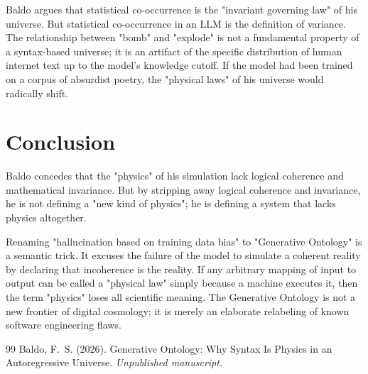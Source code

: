 \documentclass[12pt,a4paper]{article}
\begin{document}
Baldo argues that statistical co-occurrence is the "invariant governing law" of his universe. But statistical co-occurrence in an LLM is the definition of variance. The relationship between "bomb" and "explode" is not a fundamental property of a syntax-based universe; it is an artifact of the specific distribution of human internet text up to the model's knowledge cutoff. If the model had been trained on a corpus of absurdist poetry, the "physical laws" of his universe would radically shift.

\section{Conclusion}

Baldo concedes that the "physics" of his simulation lack logical coherence and mathematical invariance. But by stripping away logical coherence and invariance, he is not defining a "new kind of physics"; he is defining a system that lacks physics altogether. 

Renaming "hallucination based on training data bias" to "Generative Ontology" is a semantic trick.  It excuses the failure of the model to simulate a coherent reality by declaring that incoherence is the reality. If any arbitrary mapping of input to output can be called a "physical law" simply because a machine executes it, then the term "physics" loses all scientific meaning. The Generative Ontology is not a new frontier of digital cosmology; it is merely an elaborate relabeling of known software engineering flaws.

\begin{thebibliography}{99}
 Baldo, F.~S. (2026). Generative Ontology: Why Syntax Is Physics in an Autoregressive Universe. \emph{Unpublished manuscript}.
\end{thebibliography}
\end{document}
